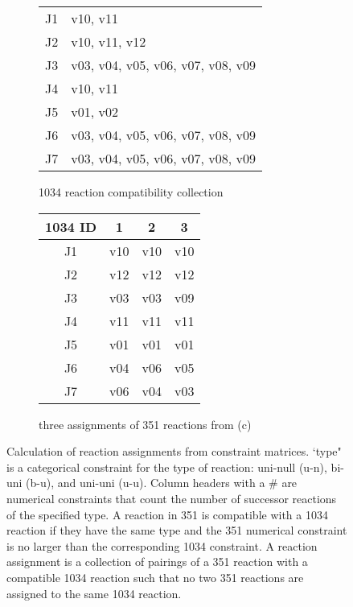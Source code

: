 \documentclass{article}
\begin{document}
\begin{figure}
\begin{subfigure}{0.4\textwidth}
\begin{tabular}{|c|l|}
\hline\hline
J1 & v10, v11\\
J2 & v10, v11, v12 \\
J3 & v03, v04, v05, v06, v07, v08, v09 \\
J4 & v10, v11\\
J5 &  v01, v02 \\
J6 & v03, v04, v05, v06, v07, v08, v09 \\
J7 & v03, v04, v05, v06, v07, v08, v09 \\
\hline
\end{tabular}
\caption{1034 reaction compatibility collection}
\end{subfigure}
\hfill
\begin{subfigure}{0.5\textwidth}
\vspace{20pt}
\begin{tabular}{|c|c|c|c|}
\hline
1034 ID & 1 & 2 & 3 \\
\hline\hline
J1 & v10 & v10 & v10 \\
J2 & v12 & v12 & v12 \\
J3 & v03 & v03 & v09 \\
J4 & v11 & v11 & v11 \\
J5 & v01 & v01 & v01 \\
J6 & v04 & v06 & v05 \\
J7 & v06 & v04 & v03 \\
\hline
\end{tabular}
\caption{three assignments of 351 reactions from (c)}
\end{subfigure}
\hfill
\caption{Calculation of reaction assignments from constraint matrices.
`type" is a categorical constraint for the type of reaction: uni-null (u-n),
bi-uni (b-u), and uni-uni (u-u). Column headers with a \# are numerical constraints
that count the number of successor reactions of the specified type. A reaction in 351 is compatible with a 1034 reaction if they have the same type and the 351 numerical constraint is no larger than the corresponding 1034 constraint. A reaction assignment is a collection of pairings of a 351 reaction with a compatible 1034 reaction such that no two 351 reactions are assigned to the same 1034 reaction.}
\label{fig:figures}
\end{figure}
\end{document}
